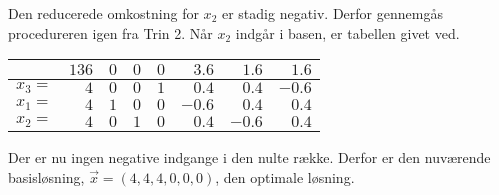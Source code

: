\begin{eks}
Den reducerede omkostning for $x_2$ er stadig negativ. Derfor gennemgås procedureren igen fra Trin 2. Når $x_2$ indgår i basen, er tabellen givet ved. 
\begin{center}
\begin{tabular}{r| r|r r r r r r|}
  \hline	
  &$136$&$0$ &$0$&$0$&$3.6$&$1.6$&$1.6$\\ \hline	
  $x_3=$&$4$&$0$&$0$&$1$&$0.4$&$0.4$&$-0.6$\\	
  $x_1=$&$4$&$1$&$0$&$0$&$-0.6$&$0.4$&$0.4$\\
  $x_2=$&$4$&$0$&$1$&$0$&$0.4$&$-0.6$&$0.4$\\
   \hline
\end{tabular}
\end{center}
Der er nu ingen negative indgange i den nulte række. Derfor er den nuværende basisløsning, $\vec{x}=(4,4,4,0,0,0)$, den optimale løsning. 
\end{eks}

